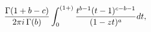 \[\frac{\mathop{\Gamma\/}\nolimits\!\left(1+b-c\right)}{2\pi i\mathop{\Gamma\/}%
\nolimits\!\left(b\right)}\int_{0}^{(1+)}\frac{t^{b-1}(t-1)^{c-b-1}}{(1-zt)^{a%
}}dt,\]